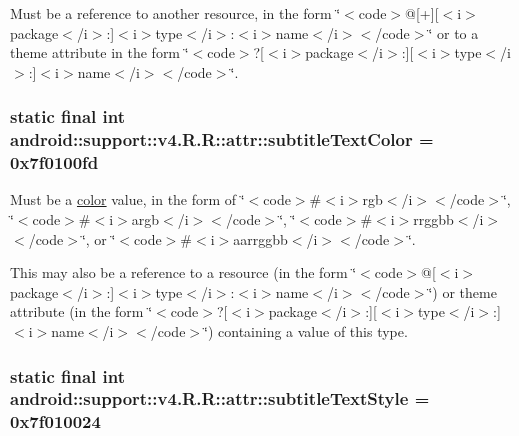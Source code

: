 Must be a reference to another resource, in the form \char`\"{}$<$code$>$@\mbox{[}+\mbox{]}\mbox{[}$<$i$>$package$<$/i$>$:\mbox{]}$<$i$>$type$<$/i$>$:$<$i$>$name$<$/i$>$$<$/code$>$\char`\"{} or to a theme attribute in the form \char`\"{}$<$code$>$?\mbox{[}$<$i$>$package$<$/i$>$:\mbox{]}\mbox{[}$<$i$>$type$<$/i$>$:\mbox{]}$<$i$>$name$<$/i$>$$<$/code$>$\char`\"{}. \hypertarget{classandroid_1_1support_1_1v4_1_1_r_1_1attr_d135e375c8352d4b24a2ede9ccfedc33}{
\subsubsection[{subtitleTextColor}]{\setlength{\rightskip}{0pt plus 5cm}static final int android::support::v4.R.R::attr::subtitleTextColor = 0x7f0100fd}}
\label{classandroid_1_1support_1_1v4_1_1_r_1_1attr_d135e375c8352d4b24a2ede9ccfedc33}


Must be a \hyperlink{classandroid_1_1support_1_1v4_1_1_r_1_1color}{color} value, in the form of \char`\"{}$<$code$>$\#$<$i$>$rgb$<$/i$>$$<$/code$>$\char`\"{}, \char`\"{}$<$code$>$\#$<$i$>$argb$<$/i$>$$<$/code$>$\char`\"{}, \char`\"{}$<$code$>$\#$<$i$>$rrggbb$<$/i$>$$<$/code$>$\char`\"{}, or \char`\"{}$<$code$>$\#$<$i$>$aarrggbb$<$/i$>$$<$/code$>$\char`\"{}. 

This may also be a reference to a resource (in the form \char`\"{}$<$code$>$@\mbox{[}$<$i$>$package$<$/i$>$:\mbox{]}$<$i$>$type$<$/i$>$:$<$i$>$name$<$/i$>$$<$/code$>$\char`\"{}) or theme attribute (in the form \char`\"{}$<$code$>$?\mbox{[}$<$i$>$package$<$/i$>$:\mbox{]}\mbox{[}$<$i$>$type$<$/i$>$:\mbox{]}$<$i$>$name$<$/i$>$$<$/code$>$\char`\"{}) containing a value of this type. \hypertarget{classandroid_1_1support_1_1v4_1_1_r_1_1attr_1f8ded42abf93cc99194c13d0690dbb7}{
\subsubsection[{subtitleTextStyle}]{\setlength{\rightskip}{0pt plus 5cm}static final int android::support::v4.R.R::attr::subtitleTextStyle = 0x7f010024}}
\label{classandroid_1_1support_1_1v4_1_1_r_1_1attr_1f8ded42abf93cc99194c13d0690dbb7}


